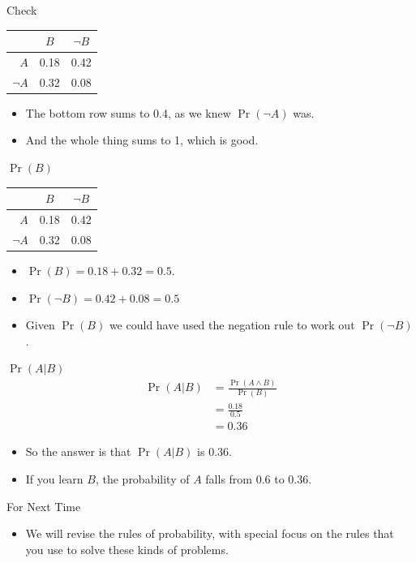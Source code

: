 \documentclass[
  ignorenonframetext,
]{beamer}
\providecommand{\tightlist}{%
  \setlength{\itemsep}{0pt}\setlength{\parskip}{0pt}}
\renewcommand{\,}{\text{, }}
\begin{document}
\begin{frame}{Check}
\protect\hypertarget{check-1}{}
\begin{longtable}[]{@{}rcc@{}}
\toprule
& \(B\) & \(\neg B\) \\
\midrule
\endhead
\(A\) & 0.18 & 0.42 \\
\(\neg A\) & 0.32 & 0.08 \\
\bottomrule
\end{longtable}

\begin{itemize}
\tightlist
\item
  The bottom row sums to 0.4, as we knew \(\Pr(\neg A)\) was.
\item
  And the whole thing sums to 1, which is good.
\end{itemize}
\end{frame}

\begin{frame}{\(\Pr(B)\)}
\protect\hypertarget{prb}{}
\begin{longtable}[]{@{}rcc@{}}
\toprule
& \(B\) & \(\neg B\) \\
\midrule
\endhead
\(A\) & 0.18 & 0.42 \\
\(\neg A\) & 0.32 & 0.08 \\
\bottomrule
\end{longtable}

\begin{itemize}
\tightlist
\item
  \(\Pr(B) = 0.18 + 0.32 = 0.5\). \pause
\item
  \(\Pr(\neg B) = 0.42 + 0.08 = 0.5\) \pause
\item
  Given \(\Pr(B)\) we could have used the negation rule to work out
  \(\Pr(\neg B)\).
\end{itemize}
\end{frame}

\begin{frame}{\(\Pr(A | B)\)}
\protect\hypertarget{pra-b}{}
\begin{align*}
\Pr(A | B) &= \frac{\Pr(A \wedge B)}{\Pr(B)} \\
 &= \frac{0.18}{0.5} \\
 &= 0.36
\end{align*}

\begin{itemize}
\tightlist
\item
  So the answer is that \(\Pr(A | B)\) is 0.36.
\item
  If you learn \(B\), the probability of \(A\) falls from 0.6 to 0.36.
\end{itemize}
\end{frame}

\begin{frame}{For Next Time}
\protect\hypertarget{for-next-time}{}
\begin{itemize}
\tightlist
\item
  We will revise the rules of probability, with special focus on the
  rules that you use to solve these kinds of problems.
\end{itemize}
\end{frame}
\end{document}

